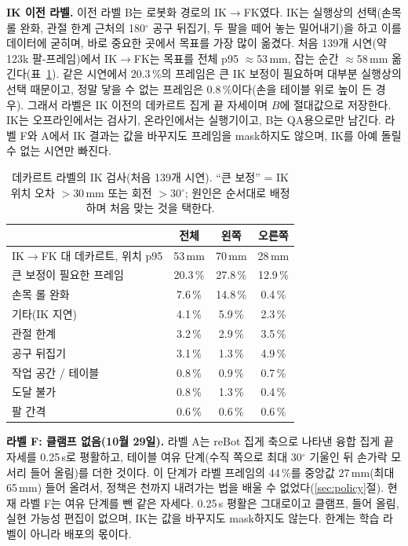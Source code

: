 \documentclass[conference,10pt]{IEEEtran}
\newcommand{\mm}{\,mm\xspace}
\begin{document}
\textbf{IK 이전 라벨.} 이전 라벨 B는 로봇화 경로의 IK$\to$FK였다. IK는 실행상의 선택(손목 롤 완화, 관절 한계 근처의 180$^\circ$
공구 뒤집기, 두 팔을 떼어 놓는 밀어내기)을 하고 이를 데이터에 굳히며, 바로 중요한 곳에서 목표를 가장 많이 옮겼다. 처음 139개
시연(약 123k 팔-프레임)에서 IK$\to$FK는 목표를 전체 p95 $\approx$53\mm, 잡는 순간 $\approx$58\mm 옮긴다(표~\ref{tab:ikqa}). 같은
시연에서 20.3\,\%의 프레임은 큰 IK 보정이 필요하며 대부분 실행상의 선택 때문이고, 정말 닿을 수 없는 프레임은 0.8\,\%이다(손을
테이블 위로 높이 든 경우). 그래서 라벨은 IK 이전의 데카르트 집게 끝 자세이며 $B$에 절대값으로 저장한다. IK는 오프라인에서는
검사기, 온라인에서는 실행기이고, B는 QA용으로만 남긴다. 라벨 F와 A에서 IK 결과는 값을 바꾸지도 프레임을 mask하지도 않으며, IK를
아예 돌릴 수 없는 시연만 빠진다.

\begin{table}[t]
\caption{데카르트 라벨의 IK 검사(처음 139개 시연). ``큰 보정'' = IK 위치 오차 $>$30\mm 또는 회전 $>$30$^\circ$; 원인은 순서대로
배정하며 처음 맞는 것을 택한다.}\label{tab:ikqa}
\centering\small
\begin{tabular}{@{}lccc@{}}
\toprule
 & 전체 & 왼쪽 & 오른쪽 \\
\midrule
IK$\to$FK 대 데카르트, 위치 p95 & 53\mm & 70\mm & 28\mm \\
큰 보정이 필요한 프레임 & 20.3\,\% & 27.8\,\% & 12.9\,\% \\
\quad 손목 롤 완화 & 7.6\,\% & 14.8\,\% & 0.4\,\% \\
\quad 기타(IK 지연) & 4.1\,\% & 5.9\,\% & 2.3\,\% \\
\quad 관절 한계 & 3.2\,\% & 2.9\,\% & 3.5\,\% \\
\quad 공구 뒤집기 & 3.1\,\% & 1.3\,\% & 4.9\,\% \\
\quad 작업 공간 / 테이블 & 0.8\,\% & 0.9\,\% & 0.7\,\% \\
\quad 도달 불가 & 0.8\,\% & 1.3\,\% & 0.4\,\% \\
\quad 팔 간격 & 0.6\,\% & 0.6\,\% & 0.6\,\% \\
\bottomrule
\end{tabular}
\end{table}

\textbf{라벨 F: 클램프 없음(10월 29일).} 라벨 A는 reBot 집게 축으로 나타낸 융합 집게 끝 자세를 0.25\,s로 평활하고, 테이블 여유
단계(수직 쪽으로 최대 30$^\circ$ 기울인 뒤 손가락 모서리 들어 올림)를 더한 것이다. 이 단계가 라벨 프레임의 44\,\%를 중앙값
27\mm(최대 65\mm) 들어 올려서, 정책은 천까지 내려가는 법을 배울 수 없었다(\ref{sec:policy}절). 현재 라벨 F는 여유 단계를 뺀 같은
자세다. 0.25\,s 평활은 그대로이고 클램프, 들어 올림, 실현 가능성 편집이 없으며, IK는 값을 바꾸지도 mask하지도 않는다. 한계는 학습 라벨이 아니라 배포의 몫이다.
\end{document}

